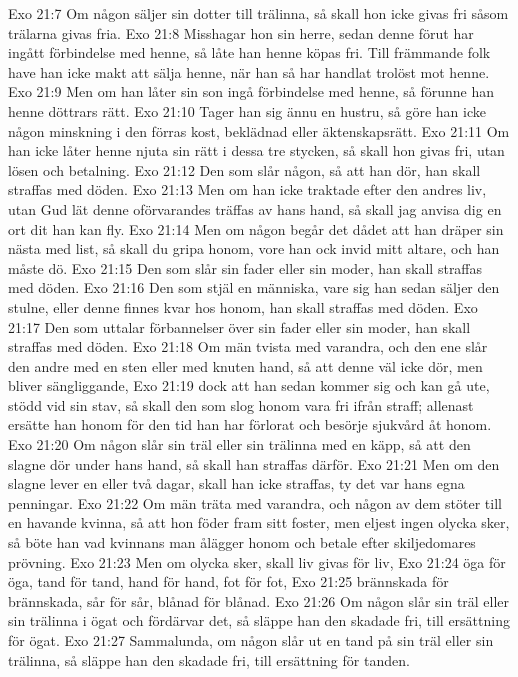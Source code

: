 Exo 21:7  Om någon säljer sin dotter till trälinna, så skall hon icke givas fri såsom trälarna givas fria.
Exo 21:8  Misshagar hon sin herre, sedan denne förut har ingått förbindelse med henne, så låte han henne köpas fri. Till främmande folk have han icke makt att sälja henne, när han så har handlat trolöst mot henne.
Exo 21:9  Men om han låter sin son ingå förbindelse med henne, så förunne han henne döttrars rätt.
Exo 21:10  Tager han sig ännu en hustru, så göre han icke någon minskning i den förras kost, beklädnad eller äktenskapsrätt.
Exo 21:11  Om han icke låter henne njuta sin rätt i dessa tre stycken, så skall hon givas fri, utan lösen och betalning.
Exo 21:12  Den som slår någon, så att han dör, han skall straffas med döden.
Exo 21:13  Men om han icke traktade efter den andres liv, utan Gud lät denne oförvarandes träffas av hans hand, så skall jag anvisa dig en ort dit han kan fly.
Exo 21:14  Men om någon begår det dådet att han dräper sin nästa med list, så skall du gripa honom, vore han ock invid mitt altare, och han måste dö.
Exo 21:15  Den som slår sin fader eller sin moder, han skall straffas med döden.
Exo 21:16  Den som stjäl en människa, vare sig han sedan säljer den stulne, eller denne finnes kvar hos honom, han skall straffas med döden.
Exo 21:17  Den som uttalar förbannelser över sin fader eller sin moder, han skall straffas med döden.
Exo 21:18  Om män tvista med varandra, och den ene slår den andre med en sten eller med knuten hand, så att denne väl icke dör, men bliver sängliggande,
Exo 21:19  dock att han sedan kommer sig och kan gå ute, stödd vid sin stav, så skall den som slog honom vara fri ifrån straff; allenast ersätte han honom för den tid han har förlorat och besörje sjukvård åt honom.
Exo 21:20  Om någon slår sin träl eller sin trälinna med en käpp, så att den slagne dör under hans hand, så skall han straffas därför.
Exo 21:21  Men om den slagne lever en eller två dagar, skall han icke straffas, ty det var hans egna penningar.
Exo 21:22  Om män träta med varandra, och någon av dem stöter till en havande kvinna, så att hon föder fram sitt foster, men eljest ingen olycka sker, så böte han vad kvinnans man ålägger honom och betale efter skiljedomares prövning.
Exo 21:23  Men om olycka sker, skall liv givas för liv,
Exo 21:24  öga för öga, tand för tand, hand för hand, fot för fot,
Exo 21:25  brännskada för brännskada, sår för sår, blånad för blånad.
Exo 21:26  Om någon slår sin träl eller sin trälinna i ögat och fördärvar det, så släppe han den skadade fri, till ersättning för ögat.
Exo 21:27  Sammalunda, om någon slår ut en tand på sin träl eller sin trälinna, så släppe han den skadade fri, till ersättning för tanden.
